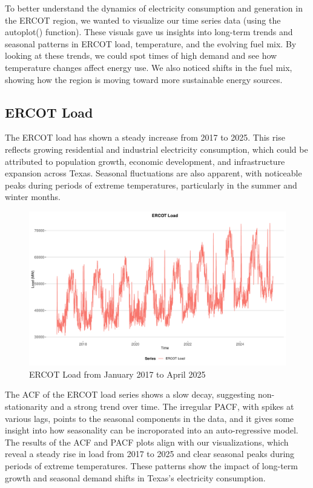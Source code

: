 \documentclass[
]{article}
\begin{document}
To better understand the dynamics of electricity consumption and
generation in the ERCOT region, we wanted to visualize our time series
data (using the autoplot() function). These visuals gave us insights
into long-term trends and seasonal patterns in ERCOT load, temperature,
and the evolving fuel mix. By looking at these trends, we could spot
times of high demand and see how temperature changes affect energy use.
We also noticed shifts in the fuel mix, showing how the region is moving
toward more sustainable energy sources.

\subsection{ERCOT Load}\label{ercot-load}

The ERCOT load has shown a steady increase from 2017 to 2025. This rise
reflects growing residential and industrial electricity consumption,
which could be attributed to population growth, economic development,
and infrastructure expansion across Texas. Seasonal fluctuations are
also apparent, with noticeable peaks during periods of extreme
temperatures, particularly in the summer and winter months.

\begin{figure}
\centering
\includegraphics{FinalProject_Report_files/figure-latex/TS ERCOT Load Plot-1.pdf}
\caption{ERCOT Load from January 2017 to April 2025}
\end{figure}

The ACF of the ERCOT load series shows a slow decay, suggesting
non-stationarity and a strong trend over time. The irregular PACF, with
spikes at various lags, points to the seasonal components in the data,
and it gives some insight into how seasonality can be incroporated into
an auto-regressive model. The results of the ACF and PACF plots align
with our visualizations, which reveal a steady rise in load from 2017 to
2025 and clear seasonal peaks during periods of extreme temperatures.
These patterns show the impact of long-term growth and seasonal demand
shifts in Texas's electricity consumption.
\end{document}

